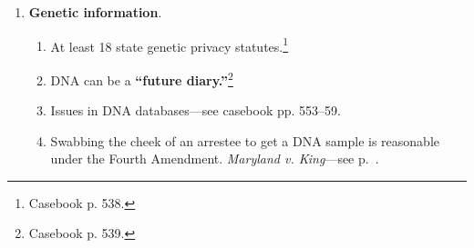 \begin{enumerate}
    \begin{enumerate}
        \item There are two types of privacy interests: \textbf{informational} 
        and \textbf{decisional}. \emph{Whalen v. Roe}.
        \item \textbf{Constitutional torts}: 42 U.S.C. \S\ 1983 provides civil 
        remedies for constitutional violations. Constitutional violations 
        become tort actions, enabling plaintiffs to win damages and injunctive 
        relief.\footnote{Casebook p. 510--11.} There must be a \textbf{state 
        actor}. Plaintiffs \emph{cannot} directly sue states because of the 
        Eleventh Amendment, but they \emph{can} sue any state or local 
        government official. They can also sue local governments when their 
        policy or custom inflicts the injury.\footnote{Casebook p. 510--11.}
        \item Hospital chaplains can't have open access to patient records, 
        but they can know the patient's ``basic problem.'' \emph{Carter v. 
        BMC}.
        \item To disclose a person's HIV status, the state must show a 
        compelling government interest that outweighs the substantial privacy 
        interest. \emph{Doe v. Borough of Barrington}.
        \item The seven \emph{Westinghouse} factors weight the privacy interest 
        against competing interests. \footnote{Casebook p. 520.} Interest like 
        containing healthcare costs can outweigh individual privacy interests. 
        \emph{Doe v. SEPTA}.
    \end{enumerate}
    \item \textbf{Genetic information}.
    \begin{enumerate}
        \item At least 18 state genetic privacy statutes.\footnote{Casebook p. 
        538.}
        \item DNA can be a \textbf{``future diary.''}\footnote{Casebook p. 
        539.}
        \item Issues in DNA databases---see casebook pp. 553--59.
        \item Swabbing the cheek of an arrestee to get a DNA sample is 
        reasonable under the Fourth Amendment. \emph{Maryland v. King}---see 
        p.~\pageref{sub:maryland-v-king}.
    \end{enumerate}
\end{enumerate}

